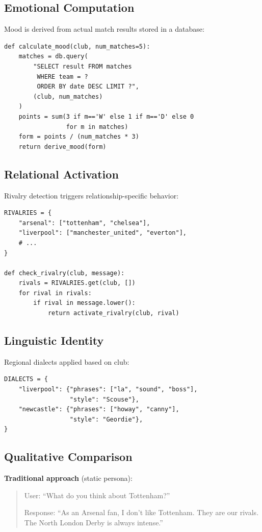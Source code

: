 \documentclass[11pt]{article}
\begin{document}
\subsection{Emotional Computation}
Mood is derived from actual match results stored in a database:
\begin{lstlisting}
def calculate_mood(club, num_matches=5):
    matches = db.query(
        "SELECT result FROM matches
         WHERE team = ?
         ORDER BY date DESC LIMIT ?",
        (club, num_matches)
    )
    points = sum(3 if m=='W' else 1 if m=='D' else 0
                 for m in matches)
    form = points / (num_matches * 3)
    return derive_mood(form)
\end{lstlisting}

\subsection{Relational Activation}
Rivalry detection triggers relationship-specific behavior:
\begin{lstlisting}
RIVALRIES = {
    "arsenal": ["tottenham", "chelsea"],
    "liverpool": ["manchester_united", "everton"],
    # ...
}

def check_rivalry(club, message):
    rivals = RIVALRIES.get(club, [])
    for rival in rivals:
        if rival in message.lower():
            return activate_rivalry(club, rival)
\end{lstlisting}

\subsection{Linguistic Identity}
Regional dialects applied based on club:
\begin{lstlisting}
DIALECTS = {
    "liverpool": {"phrases": ["la", "sound", "boss"],
                  "style": "Scouse"},
    "newcastle": {"phrases": ["howay", "canny"],
                  "style": "Geordie"},
}
\end{lstlisting}

\subsection{Qualitative Comparison}

\textbf{Traditional approach} (static persona):
\begin{quote}
User: ``What do you think about Tottenham?''

Response: ``As an Arsenal fan, I don't like Tottenham. They are our rivals. The North London Derby is always intense.''
\end{quote}
\end{document}
